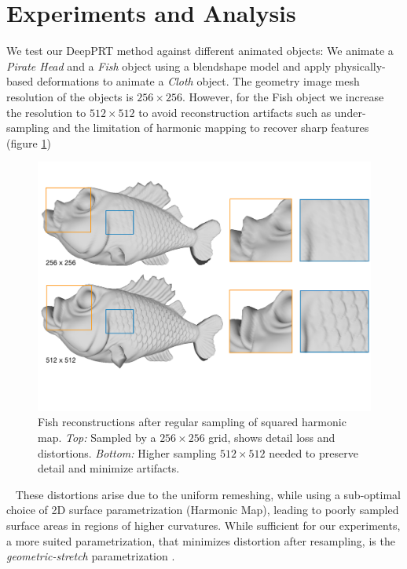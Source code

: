 
\section{Experiments and Analysis}  \label{Sec:Experiments}
We test our DeepPRT method against different animated objects: We animate a \textit{Pirate Head} and a \textit{Fish} object using a blendshape model and apply physically-based deformations to animate a \textit{Cloth} object.
The geometry image mesh resolution of the objects is $256 \times 256$. However, for the Fish object we increase the resolution to $512 \times 512$ to avoid reconstruction artifacts such as under-sampling and the limitation of harmonic mapping to recover sharp features (figure \ref{Fig: Fish Reconstruction})
\begin{figure}[H]
  \centering
    \includegraphics[width=1.0\textwidth]{Figures/fish}
     \caption{Fish reconstructions after regular sampling of squared harmonic map. \textit{Top:} Sampled by a $256 \times 256$ grid, shows detail loss and distortions. \textit{Bottom:} Higher sampling $512 \times 512$ needed to preserve detail and minimize artifacts.}
     \label{Fig: Fish Reconstruction}
\end{figure}~
These distortions arise due to the uniform remeshing, while using a sub-optimal choice of 2D surface parametrization (Harmonic Map), leading to poorly sampled surface areas in regions of higher curvatures. While sufficient for our experiments, a more suited parametrization, that minimizes distortion after resampling, is the \textit{geometric-stretch} parametrization \cite{gu2002geometry}. 
